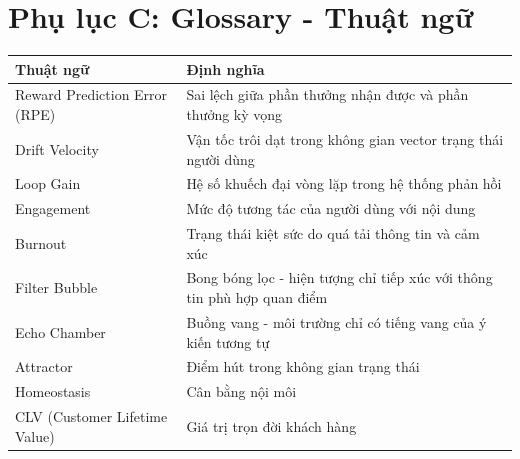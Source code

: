 \section{Phụ lục C: Glossary - Thuật ngữ}

\begin{table}[H]
\centering
\begin{tabular}{|p{5cm}|p{9cm}|}
\hline
\textbf{Thuật ngữ} & \textbf{Định nghĩa} \\
\hline
Reward Prediction Error (RPE) & Sai lệch giữa phần thưởng nhận được và phần thưởng kỳ vọng \\
\hline
Drift Velocity & Vận tốc trôi dạt trong không gian vector trạng thái người dùng \\
\hline
Loop Gain & Hệ số khuếch đại vòng lặp trong hệ thống phản hồi \\
\hline
Engagement & Mức độ tương tác của người dùng với nội dung \\
\hline
Burnout & Trạng thái kiệt sức do quá tải thông tin và cảm xúc \\
\hline
Filter Bubble & Bong bóng lọc - hiện tượng chỉ tiếp xúc với thông tin phù hợp quan điểm \\
\hline
Echo Chamber & Buồng vang - môi trường chỉ có tiếng vang của ý kiến tương tự \\
\hline
Attractor & Điểm hút trong không gian trạng thái \\
\hline
Homeostasis & Cân bằng nội môi \\
\hline
CLV (Customer Lifetime Value) & Giá trị trọn đời khách hàng \\
\hline
\end{tabular}
\end{table}


